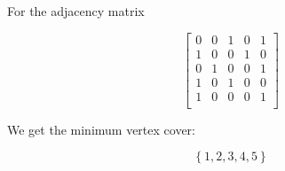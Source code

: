 \documentclass[12pt,listof=totoc,toc=sectionentrywithdots]{scrartcl}
\begin{document}
For the adjacency matrix

\[
    \begin{bmatrix}
        0 & 0 & 1 & 0 & 1 \\
        1 & 0 & 0 & 1 & 0 \\
        0 & 1 & 0 & 0 & 1 \\
        1 & 0 & 1 & 0 & 0 \\
        1 & 0 & 0 & 0 & 1 \\
    \end{bmatrix}
\]

We get the minimum vertex cover:

\begin{equation*}
    \left\{ 1, 2, 3, 4, 5 \right\}
\end{equation*}


\end{document}
